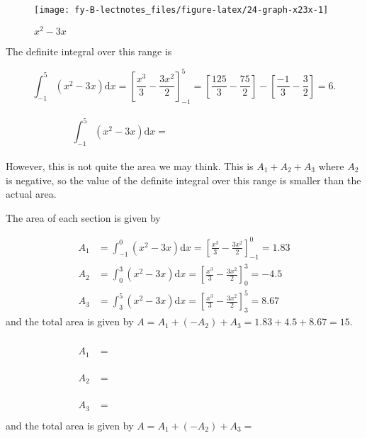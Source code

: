 \documentclass[
  11pt,
  oneside]{book}
\newcommand{\slide}{}
\theoremstyle{definition}
\theoremstyle{definition}
\theoremstyle{definition}
\theoremstyle{definition}
\theoremstyle{remark}
\begin{document}
\begin{figure}

{\centering \texttt{[image: fy-B-lectnotes\_files/figure-latex/24-graph-x23x-1]} 

}

\caption{$x^2-3x$}\label{fig:24-graph-x23x}
\end{figure}
\slide

The definite integral over this range is

\begin{notslides}

\[
\int_{-1}^5(x^2-3x)\mathrm{d}x = \left[\frac{x^3}3-\frac{3x^2}2\right]_{-1}^5 = \left[\frac{125}3-\frac{75}2\right]-\left[\frac{-1}3-\frac{3}2\right]=6.
\]

\end{notslides}

\begin{slidesonly}

\[
\int_{-1}^5(x^2-3x)\mathrm{d}x = \phantom{\left[\frac{x^3}3-\frac{3x^2}2\right]_{-1}^5 = \left[\frac{125}3-\frac{75}2\right]}
\]
\vfill

\end{slidesonly}

However, this is not quite the area we may think. This is \(A_1 + A_2 + A_3\) where \(A_2\) is negative, so the value of the definite integral over this range is smaller than the actual area.

\slide

The area of each section is given by

\begin{notslides}

\begin{align*}
A_1&=\int_{-1}^0(x^2-3x)\mathrm{d}x = \left[\frac{x^3}3-\frac{3x^2}2\right]_{-1}^0 = 1.83\\
A_2&=\int_{0}^3(x^2-3x)\mathrm{d}x = \left[\frac{x^3}3-\frac{3x^2}2\right]_{0}^3 = -4.5\\
A_3&=\int_{3}^5(x^2-3x)\mathrm{d}x = \left[\frac{x^3}3-\frac{3x^2}2\right]_{3}^5 = 8.67
\end{align*}
and the total area is given by \(A = A_1 + (-A_2) + A_3 = 1.83 + 4.5 + 8.67 = 15\).

\end{notslides}

\begin{slidesonly}

\begin{align*}
A_1&=\phantom{\int_{-1}^0(x^2-3x)\mathrm{d}x = \left[\frac{x^3}3-\frac{3x^2}2\right]_{-1}^0 = 1.83}\\
A_2&=\phantom{\int_{0}^3(x^2-3x)\mathrm{d}x = \left[\frac{x^3}3-\frac{3x^2}2\right]_{0}^3 = -4.5}\\
A_3&=\phantom{\int_{3}^5(x^2-3x)\mathrm{d}x = \left[\frac{x^3}3-\frac{3x^2}2\right]_{3}^5 = 8.67}
\end{align*}
and the total area is given by \(A = A_1 + (-A_2) + A_3 =\)

\end{slidesonly}
\end{document}
